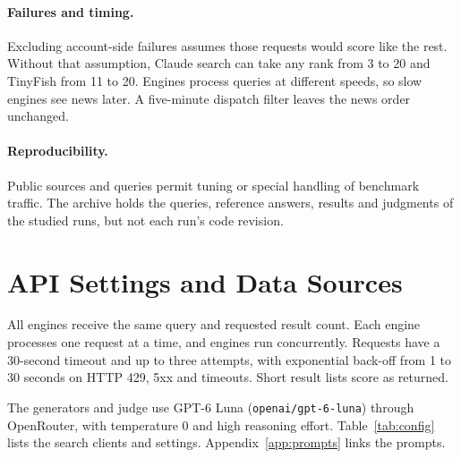 \documentclass[11pt]{article}
\begin{document}
\paragraph{Failures and timing.}
Excluding account-side failures assumes those requests would score like
the rest. Without that assumption, Claude search can take any rank from
3 to 20 and TinyFish from 11 to 20. Engines process
queries at different speeds, so slow engines see news later. A
five-minute dispatch filter leaves the news order unchanged.

\paragraph{Reproducibility.}
Public sources and queries permit tuning or special handling of benchmark
traffic. The archive holds the queries, reference answers, results and
judgments of the studied runs, but not each run's code revision.



\appendix
\setcounter{dbltopnumber}{3}\renewcommand{\dbltopfraction}{0.9}\renewcommand{\dblfloatpagefraction}{0.8}

\section{API Settings and Data Sources}
\label{app:examples}

All engines receive the same query and requested result count.
Each engine processes one request at a time, and engines run
concurrently. Requests have a 30-second timeout and up to three attempts,
with exponential back-off from 1 to 30 seconds on HTTP 429, 5xx and
timeouts. Short result lists score as returned.

The generators and judge use GPT-6 Luna (\texttt{openai/gpt-6-luna})
through OpenRouter, with temperature 0 and high reasoning effort.
Table~\ref{tab:config} lists the search clients and settings.
Appendix~\ref{app:prompts} links the prompts.
\end{document}
